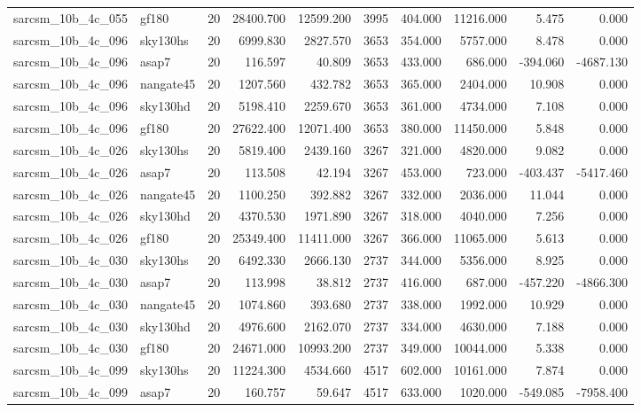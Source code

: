 \documentclass{article}
\begin{document}
\begin{longtable}{llrrrrrrrr}
sarcsm\_10b\_4c\_055 & gf180 & 20 & 28400.700 & 12599.200 & 3995 & 404.000 & 11216.000 & 5.475 & 0.000 \\
sarcsm\_10b\_4c\_096 & sky130hs & 20 & 6999.830 & 2827.570 & 3653 & 354.000 & 5757.000 & 8.478 & 0.000 \\
sarcsm\_10b\_4c\_096 & asap7 & 20 & 116.597 & 40.809 & 3653 & 433.000 & 686.000 & -394.060 & -4687.130 \\
sarcsm\_10b\_4c\_096 & nangate45 & 20 & 1207.560 & 432.782 & 3653 & 365.000 & 2404.000 & 10.908 & 0.000 \\
sarcsm\_10b\_4c\_096 & sky130hd & 20 & 5198.410 & 2259.670 & 3653 & 361.000 & 4734.000 & 7.108 & 0.000 \\
sarcsm\_10b\_4c\_096 & gf180 & 20 & 27622.400 & 12071.400 & 3653 & 380.000 & 11450.000 & 5.848 & 0.000 \\
sarcsm\_10b\_4c\_026 & sky130hs & 20 & 5819.400 & 2439.160 & 3267 & 321.000 & 4820.000 & 9.082 & 0.000 \\
sarcsm\_10b\_4c\_026 & asap7 & 20 & 113.508 & 42.194 & 3267 & 453.000 & 723.000 & -403.437 & -5417.460 \\
sarcsm\_10b\_4c\_026 & nangate45 & 20 & 1100.250 & 392.882 & 3267 & 332.000 & 2036.000 & 11.044 & 0.000 \\
sarcsm\_10b\_4c\_026 & sky130hd & 20 & 4370.530 & 1971.890 & 3267 & 318.000 & 4040.000 & 7.256 & 0.000 \\
sarcsm\_10b\_4c\_026 & gf180 & 20 & 25349.400 & 11411.000 & 3267 & 366.000 & 11065.000 & 5.613 & 0.000 \\
sarcsm\_10b\_4c\_030 & sky130hs & 20 & 6492.330 & 2666.130 & 2737 & 344.000 & 5356.000 & 8.925 & 0.000 \\
sarcsm\_10b\_4c\_030 & asap7 & 20 & 113.998 & 38.812 & 2737 & 416.000 & 687.000 & -457.220 & -4866.300 \\
sarcsm\_10b\_4c\_030 & nangate45 & 20 & 1074.860 & 393.680 & 2737 & 338.000 & 1992.000 & 10.929 & 0.000 \\
sarcsm\_10b\_4c\_030 & sky130hd & 20 & 4976.600 & 2162.070 & 2737 & 334.000 & 4630.000 & 7.188 & 0.000 \\
sarcsm\_10b\_4c\_030 & gf180 & 20 & 24671.000 & 10993.200 & 2737 & 349.000 & 10044.000 & 5.338 & 0.000 \\
sarcsm\_10b\_4c\_099 & sky130hs & 20 & 11224.300 & 4534.660 & 4517 & 602.000 & 10161.000 & 7.874 & 0.000 \\
sarcsm\_10b\_4c\_099 & asap7 & 20 & 160.757 & 59.647 & 4517 & 633.000 & 1020.000 & -549.085 & -7958.400 \\

\end{longtable}
\end{document}
